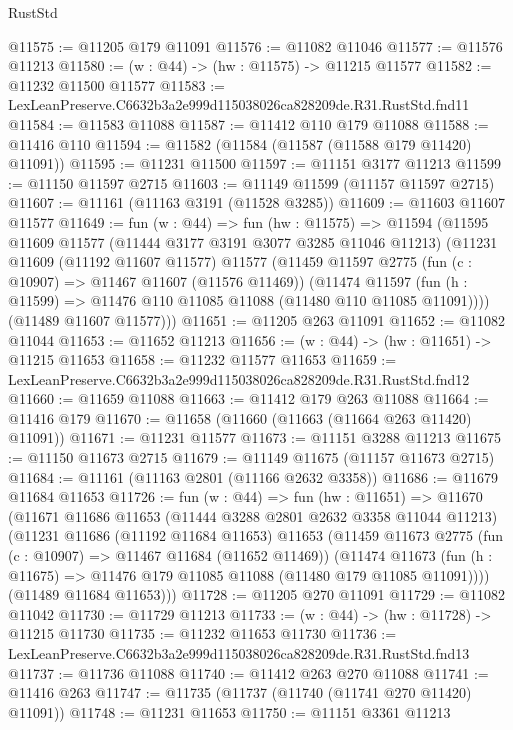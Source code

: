 \begin{lexlean}{RustStd}
\begin{coremodule}
@11575 := @11205 @179 @11091
@11576 := @11082 @11046
@11577 := @11576 @11213
@11580 := (w : @44) -> (hw : @11575) -> @11215 @11577
@11582 := @11232 @11500 @11577
@11583 := LexLeanPreserve.C6632b3a2e999d115038026ca828209de.R31.RustStd.fnd11
@11584 := @11583 @11088
@11587 := @11412 @110 @179 @11088
@11588 := @11416 @110
@11594 := @11582 (@11584 (@11587 (@11588 @179 @11420) @11091))
@11595 := @11231 @11500
@11597 := @11151 @3177 @11213
@11599 := @11150 @11597 @2715
@11603 := @11149 @11599 (@11157 @11597 @2715)
@11607 := @11161 (@11163 @3191 (@11528 @3285))
@11609 := @11603 @11607 @11577
@11649 := fun (w : @44) =>
  fun (hw : @11575) =>
  @11594
    (@11595
      @11609
      @11577
      (@11444 @3177 @3191 @3077 @3285 @11046 @11213)
      (@11231
        @11609
        (@11192 @11607 @11577)
        @11577
        (@11459
          @11597
          @2775
          (fun (c : @10907) => @11467 @11607 (@11576 @11469))
          (@11474
            @11597
            (fun (h : @11599) => @11476 @110 @11085 @11088 (@11480 @110 @11085 @11091))))
        (@11489 @11607 @11577)))
@11651 := @11205 @263 @11091
@11652 := @11082 @11044
@11653 := @11652 @11213
@11656 := (w : @44) -> (hw : @11651) -> @11215 @11653
@11658 := @11232 @11577 @11653
@11659 := LexLeanPreserve.C6632b3a2e999d115038026ca828209de.R31.RustStd.fnd12
@11660 := @11659 @11088
@11663 := @11412 @179 @263 @11088
@11664 := @11416 @179
@11670 := @11658 (@11660 (@11663 (@11664 @263 @11420) @11091))
@11671 := @11231 @11577
@11673 := @11151 @3288 @11213
@11675 := @11150 @11673 @2715
@11679 := @11149 @11675 (@11157 @11673 @2715)
@11684 := @11161 (@11163 @2801 (@11166 @2632 @3358))
@11686 := @11679 @11684 @11653
@11726 := fun (w : @44) =>
  fun (hw : @11651) =>
  @11670
    (@11671
      @11686
      @11653
      (@11444 @3288 @2801 @2632 @3358 @11044 @11213)
      (@11231
        @11686
        (@11192 @11684 @11653)
        @11653
        (@11459
          @11673
          @2775
          (fun (c : @10907) => @11467 @11684 (@11652 @11469))
          (@11474
            @11673
            (fun (h : @11675) => @11476 @179 @11085 @11088 (@11480 @179 @11085 @11091))))
        (@11489 @11684 @11653)))
@11728 := @11205 @270 @11091
@11729 := @11082 @11042
@11730 := @11729 @11213
@11733 := (w : @44) -> (hw : @11728) -> @11215 @11730
@11735 := @11232 @11653 @11730
@11736 := LexLeanPreserve.C6632b3a2e999d115038026ca828209de.R31.RustStd.fnd13
@11737 := @11736 @11088
@11740 := @11412 @263 @270 @11088
@11741 := @11416 @263
@11747 := @11735 (@11737 (@11740 (@11741 @270 @11420) @11091))
@11748 := @11231 @11653
@11750 := @11151 @3361 @11213

\end{coremodule}
\end{lexlean}
